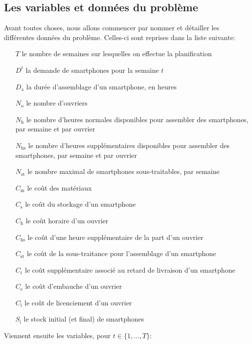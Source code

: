 \subsection*{Les variables et données du problème   }
Avant toutes choses, nous allons commencer par nommer et détailler les différentes données du problème. Celles-ci sont reprises dans la liste suivante:

\begin{itemize}[before={\renewcommand\makelabel[1]{\makebox[1cm][r]{##1\hspace{.2cm}}}}]
    \item[$T$] le nombre de semaines sur lesquelles on effectue la planification
    \item[$D^t$] la demande de smartphones pour la semaine $t$
    \item[$D_\mathrm{a}$] la durée d'assemblage d'un smartphone, en heures
    \item[$N_\mathrm{o}$] le nombre d'ouvriers
    \item[$N_\mathrm{h}$] le nombre d'heures normales disponibles pour assembler des smartphones, par semaine et par ouvrier
    \item[$N_\mathrm{hs}$] le nombre d'heures supplémentaires disponibles pour assembler des smartphones, par semaine et par ouvrier
    \item[$N_\mathrm{st}$] le nombre maximal de smartphones sous-traitables, par semaine 
    \item[$C_\mathrm{m}$] le coût des matériaux
    \item[$C_\mathrm{s}$] le coût du stockage d'un smartphone
    \item[$C_\mathrm{h}$] le coût horaire d'un ouvrier
    \item[$C_\mathrm{hs}$] le coût d'une heure supplémentaire de la part d'un ouvrier
    \item[$C_\mathrm{st}$] le coût de la sous-traitance pour l'assemblage d'un smartphone
    \item[$C_\mathrm{r}$] le coût supplémentaire associé au retard de livraison d'un smartphone
    \item[$C_\mathrm{e}$] le coût d'embauche d'un ouvrier
    \item[$C_\mathrm{l}$] le coût de licenciement d'un ouvrier
    \item[$S_\mathrm{i}$] le stock initial (et final) de smartphones
\end{itemize}

Viennent ensuite les variables, pour $t \in \{1,\dots,T\}$:

